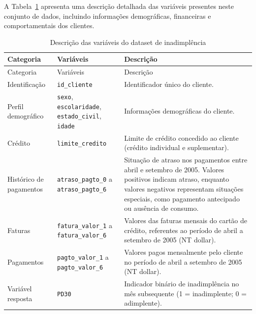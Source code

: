 \documentclass[
  brazilian,
  12pt,
  letterpaper,
  DIV=11,
  numbers=noendperiod]{scrartcl}
\begin{document}
A Tabela~\ref{tbl-descricao-inadimplencia} apresenta uma descrição
detalhada das variáveis presentes neste conjunto de dados, incluindo
informações demográficas, financeiras e comportamentais dos clientes.

\begin{longtable}[]{@{}
  >{\raggedright\arraybackslash}p{}
  >{\raggedright\arraybackslash}p{}
  >{\raggedright\arraybackslash}p{}@{}}
\caption{Descrição das variáveis do dataset de
inadimplência}\label{tbl-descricao-inadimplencia}\tabularnewline
\toprule\noalign{}
\begin{minipage}[b]{\linewidth}\raggedright
Categoria
\end{minipage} & \begin{minipage}[b]{\linewidth}\raggedright
Variáveis
\end{minipage} & \begin{minipage}[b]{\linewidth}\raggedright
Descrição
\end{minipage} \\
\midrule\noalign{}
\endfirsthead
\toprule\noalign{}
\begin{minipage}[b]{\linewidth}\raggedright
Categoria
\end{minipage} & \begin{minipage}[b]{\linewidth}\raggedright
Variáveis
\end{minipage} & \begin{minipage}[b]{\linewidth}\raggedright
Descrição
\end{minipage} \\
\midrule\noalign{}
\endhead
\bottomrule\noalign{}
\endlastfoot
Identificação & \texttt{id\_cliente} & Identificador único do
cliente. \\
Perfil demográfico & \texttt{sexo}, \texttt{escolaridade},
\texttt{estado\_civil}, \texttt{idade} & Informações demográficas do
cliente. \\
Crédito & \texttt{limite\_credito} & Limite de crédito concedido ao
cliente (crédito individual e suplementar). \\
Histórico de pagamentos & \texttt{atraso\_pagto\_0} a
\texttt{atraso\_pagto\_6} & Situação de atraso nos pagamentos entre
abril e setembro de 2005. Valores positivos indicam atraso, enquanto
valores negativos representam situações especiais, como pagamento
antecipado ou ausência de consumo. \\
Faturas & \texttt{fatura\_valor\_1} a \texttt{fatura\_valor\_6} &
Valores das faturas mensais do cartão de crédito, referentes ao período
de abril a setembro de 2005 (NT dollar). \\
Pagamentos & \texttt{pagto\_valor\_1} a \texttt{pagto\_valor\_6} &
Valores pagos mensalmente pelo cliente no período de abril a setembro de
2005 (NT dollar). \\
Variável resposta & \texttt{PD30} & Indicador binário de inadimplência
no mês subsequente (1 = inadimplente; 0 = adimplente). \\
\end{longtable}
\end{document}
